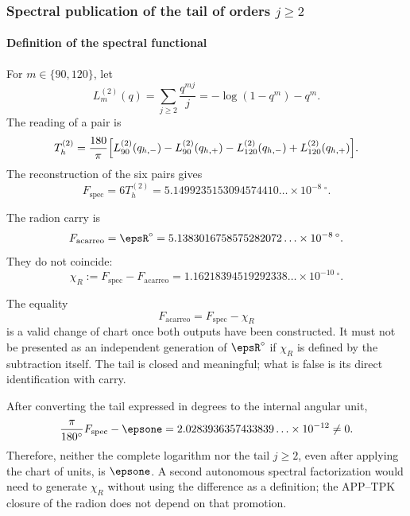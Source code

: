 \subsubsection{Spectral publication of the tail of orders \(j\ge2\)}

\paragraph{Definition of the spectral functional}

For \(m\in\{90,120\}\), let
\begin{equation}
L_m^{(2)}(q)=\sum_{j\ge2}\frac{q^{mj}}{j}
=-\log(1-q^m)-q^m.
\label{eq:L2}
\end{equation}
The reading of a pair is
\begin{equation}
T_h^{(2)}=\frac{180}{\pi}
\Bigl[
L_{90}^{(2)}(q_{h,-})-L_{90}^{(2)}(q_{h,+})
-L_{120}^{(2)}(q_{h,-})+L_{120}^{(2)}(q_{h,+})
\Bigr].
\label{eq:T-h}
\end{equation}
The reconstruction of the six pairs gives
\begin{equation}
F_{\mathrm{spec}}=6T_h^{(2)}
=5.1499235153094574410\ldots\times10^{-8}\,{}^\circ.
\label{eq:Fspec}
\end{equation}

The radion carry is
\[
F_{\mathrm{acarreo}}=\epsR^\circ
=5.1383016758575282072\ldots\times10^{-8}\,{}^\circ.
\]
They do not coincide:
\begin{equation}
\chi_R:=F_{\mathrm{spec}}-F_{\mathrm{acarreo}}
=1.16218394519292338\ldots\times10^{-10}\,{}^\circ.
\label{eq:chiR}
\end{equation}

The equality
\[
F_{\mathrm{acarreo}}=F_{\mathrm{spec}}-\chi_R
\]
is a valid change of chart once both outputs have been constructed. It must not
be presented as an independent generation of \(\epsR^\circ\) if \(\chi_R\) is
defined by the subtraction itself. The tail is closed and meaningful; what is false
is its direct identification with carry.

\begin{falsifier}
After converting the tail expressed in degrees to the internal angular unit,
\[
\frac{\pi}{180^\circ}F_{\mathrm{spec}}-\epsone
=2.0283936357433839\ldots\times10^{-12}\ne0.
\]
Therefore, neither the complete logarithm nor the tail \(j\ge2\), even after applying the
chart of units, is \(\epsone\). A
second autonomous spectral factorization would need to generate \(\chi_R\) without
using the difference as a definition; the APP--TPK closure of the radion does not depend
on that promotion.
\end{falsifier}


